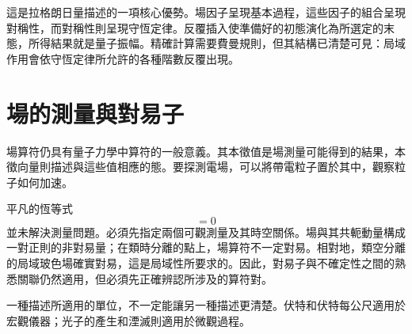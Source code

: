 這是拉格朗日量描述的一項核心優勢。場因子呈現基本過程，這些因子的組合呈現對稱性，而對稱性則呈現守恆定律。反覆插入使準備好的初態演化為所選定的末態，所得結果就是量子振幅。精確計算需要費曼規則，但其結構已清楚可見：局域作用會依守恆定律所允許的各種階數反覆出現。

\section{場的測量與對易子}

場算符仍具有量子力學中算符的一般意義。其本徵值是場測量可能得到的結果，本徵向量則描述與這些值相應的態。要探測電場，可以將帶電粒子置於其中，觀察粒子如何加速。

\begin{classroomqa}
\end{classroomqa}

平凡的恆等式
\begin{equation}
[\phi(x),\phi(x)]=0
\end{equation}
並未解決測量問題。必須先指定兩個可觀測量及其時空關係。場與其共軛動量構成一對正則的非對易量；在類時分離的點上，場算符不一定對易。相對地，類空分離的局域玻色場確實對易，這是局域性所要求的。因此，對易子與不確定性之間的熟悉關聯仍然適用，但必須先正確辨認所涉及的算符對。

\begin{classroomqa}
\end{classroomqa}

一種描述所適用的單位，不一定能讓另一種描述更清楚。伏特和伏特每公尺適用於宏觀儀器；光子的產生和湮滅則適用於微觀過程。

\begin{classroomqa}
\end{classroomqa}

